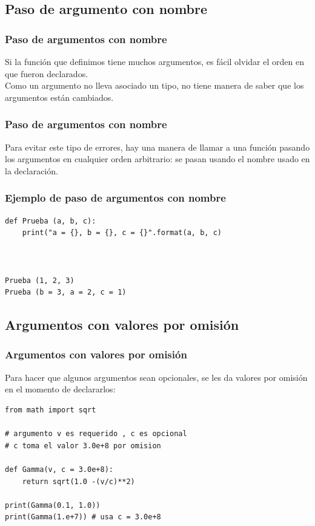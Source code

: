 \subsection{Paso de argumento con nombre}
\begin{frame}
\frametitle{Paso de argumentos con nombre}
Si la función que definimos tiene muchos argumentos, es fácil olvidar el orden en que fueron declarados.
\\
\medskip
Como un argumento no lleva asociado un tipo, \python{} no tiene manera de saber que los argumentos están cambiados.
\end{frame}
\begin{frame}
\frametitle{Paso de argumentos con nombre}
Para evitar este tipo de errores, hay una manera de llamar a una función pasando los argumentos en cualquier orden arbitrario: se pasan usando el nombre usado en la declaración.
\end{frame}
\begin{frame}[fragile]
\frametitle{Ejemplo de paso de argumentos con nombre}
\begin{lstlisting}[style=codigopython]
def Prueba (a, b, c):
    print("a = {}, b = {}, c = {}".format(a, b, c)



Prueba (1, 2, 3)
Prueba (b = 3, a = 2, c = 1)
\end{lstlisting}
\end{frame}
\subsection{Argumentos con valores por omisión}
\begin{frame}
\frametitle{Argumentos con valores por omisión}
Para hacer que algunos argumentos sean opcionales, se les da valores por omisión en el momento de declararlos:
\begin{lstlisting}[style=codigopython]
from math import sqrt

# argumento v es requerido , c es opcional
# c toma el valor 3.0e+8 por omision

def Gamma(v, c = 3.0e+8):
    return sqrt(1.0 -(v/c)**2)

print(Gamma(0.1, 1.0))
print(Gamma(1.e+7)) # usa c = 3.0e+8
\end{lstlisting}
\end{frame}
